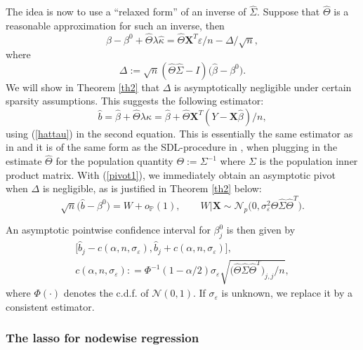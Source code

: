 \documentclass[aos,MSNbibl,dvips]{arximspdf}
\def\cal{\mathcal}
\newcommand{\PP}{\mathbb{P}}
\newcommand{\eps}{\varepsilon}
\newcommand{\bx}{\mathbf{X}}
\begin{document}
The idea is now to use a ``relaxed form'' of an inverse of
$\hat{\Sigma}$. Suppose that $\hat{\Theta}$ is a reasonable approximation
for such an inverse, then
%
\begin{equation}
\label{pivot1} \hat{\beta} - \beta^0 +\hat{\Theta} \lambda\hat{\kappa}
= \hat{\Theta} \bx^T \eps/n - \Delta/\sqrt n,
\end{equation}
%
where
%
\[
\Delta:= \sqrt n (\hat{\Theta} \hat{\Sigma} - I) \bigl(\hat{\beta} -
\beta^0\bigr). %
\]
%
We will show in Theorem \ref{th2} that $\Delta$ is asymptotically
negligible under certain sparsity assumptions. This suggests the
following estimator:
%
\begin{equation}
\label{b1} \hat{b} = \hat{\beta} + \hat{\Theta} \lambda\hat{\kappa} = \hat{
\beta} + \hat{\Theta} \bx^T(Y - \bx\hat{\beta})/n,
\end{equation}
%
using (\ref{hattau}) in the second equation. This is essentially the same
estimator as in \cite{zhangzhang11} and it is of the same form as the
SDL-procedure in
\cite{jamo13}, when plugging in the estimate $\hat{\Theta}$ for the
population quantity $\Theta:= \Sigma^{-1}$ where $\Sigma$ is the
population inner
product matrix.
With (\ref{pivot1}), we immediately obtain an asymptotic pivot when
$\Delta$ is negligible, as is justified in Theorem
\ref{th2} below:
%
\begin{equation}
\label{piv1} \sqrt{n}\bigl(\hat{b} - \beta^0\bigr) =
W+o_{\PP}(1),\qquad  W|\bx\sim{\cal N}_p\bigl(0,
\sigma_{\eps}^2 \hat{\Theta} \hat{\Sigma} \hat{
\Theta}^T\bigr).
\end{equation}

An asymptotic pointwise confidence interval for $\beta^0_j$ is then
given by
%
\begin{eqnarray*}
& \bigl[\hat{b}_j - c(\alpha,n,\sigma_{\eps}),
\hat{b}_j + c(\alpha,n,\sigma_{\eps})\bigr],&
\\
& c(\alpha,n,\sigma_{\eps}): = \Phi^{-1}(1 - \alpha/2)
\sigma_{\eps} \sqrt{\bigl(\hat{\Theta} \hat{\Sigma} \hat{
\Theta}^T\bigr)_{j,j}/n},&
\end{eqnarray*}
%
where $\Phi(\cdot)$ denotes the c.d.f. of ${\cal N}(0,1)$.
If $\sigma_{\eps}$ is unknown, we replace it by a consistent estimator.

\subsubsection{The lasso for nodewise regression}\label{subsecnodelasso}
\end{document}
